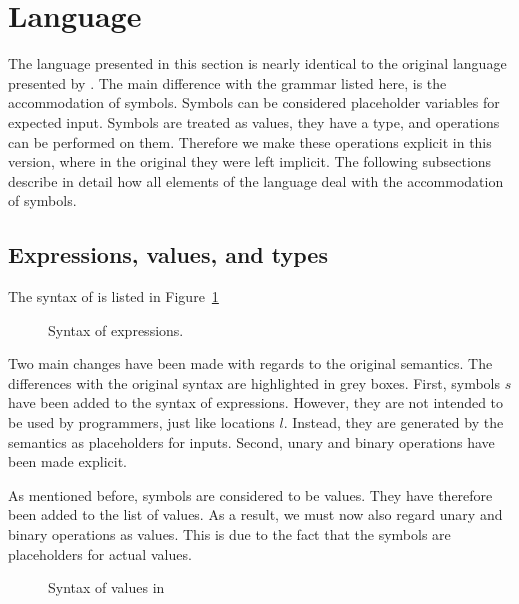 

\section{Language}
\label{sec:language}

The language presented in this section is nearly identical to the original \TOPHAT language presented by \citet{Steenvoorden2019}.
The main difference with the grammar listed here, is the accommodation of symbols.
Symbols can be considered placeholder variables for expected input.
Symbols are treated as values, they have a type, and operations can be performed on them.
Therefore we make these operations explicit in this version,
where in the original they were left implicit.
The following subsections describe in detail how all elements of the \TOPHAT language deal with the accommodation of symbols.


\subsection{Expressions, values, and types}
\label{expressions}

The syntax of \TOPHAT is listed in Figure~\ref{fig:syntaxtophat}

\begin{figure}[h]
  \small
  \caption{Syntax of \TOPHAT expressions.}
  \label{fig:syntaxtophat}
\end{figure}

Two main changes have been made with regards to the original \TOPHAT semantics.
The differences with the original syntax are highlighted in grey boxes.
First, symbols $s$ have been added to the syntax of expressions.
However, they are not intended to be used by programmers, just like locations $l$.
Instead, they are generated by the semantics as placeholders for inputs.
Second, unary and binary operations have been made explicit.

As mentioned before, symbols are considered to be values.
They have therefore been added to the list of values.
As a result, we must now also regard unary and binary operations as values.
This is due to the fact that the symbols are placeholders for actual values.

\begin{figure}[h]
  \small
  \caption{Syntax of values in \TOPHAT}
  \label{fig:syntaxvalues}
\end{figure}


